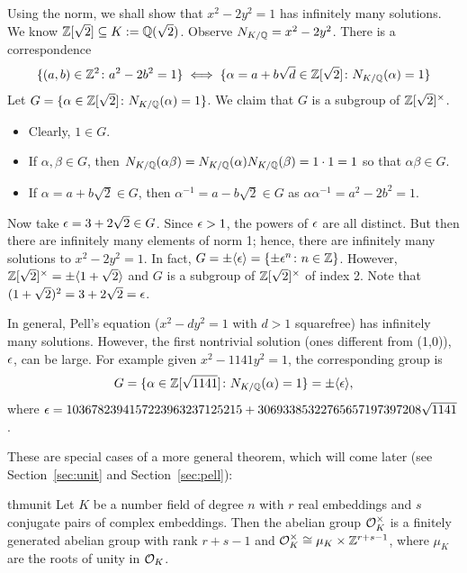 \begin{ex}[Pell's Equation, $n=2$] \label{ex:pell2}
Using the norm, we shall show that $x^2-2y^2=1$ has infinitely many solutions. We know $\mathbb{Z}[\sqrt{2}] \subseteq K:=\mathbb{Q}(\sqrt{2})$. Observe $N_{K/\mathbb{Q}}=x^2-2y^2$. There is a correspondence
	\[
	\{(a,b) \in \mathbb{Z}^2 \colon a^2-2b^2=1\} \iff \{\alpha=a+b\sqrt{d} \in \mathbb{Z}[\sqrt{2}] \colon N_{K/\mathbb{Q}}(\alpha)=1\}
	\] 
Let $G=\{\alpha \in \mathbb{Z}[\sqrt{2}] \colon N_{K/\mathbb{Q}}(\alpha)=1\}$. We claim that $G$ is a subgroup of $\mathbb{Z}[\sqrt{2}]^\times$.
	\begin{itemize}
	\item Clearly, $1 \in G$.
	\item If $\alpha, \beta \in G$, then $N_{K/\mathbb{Q}}(\alpha\beta)=N_{K/\mathbb{Q}}(\alpha)N_{K/\mathbb{Q}}(\beta)=1\cdot 1=1$ so that $\alpha\beta \in G$.
	\item If $\alpha=a+b\sqrt{2} \in G$, then $\alpha^{-1}=a-b\sqrt{2} \in G$ as $\alpha\alpha^{-1}=a^2-2b^2=1$.
	\end{itemize}
Now take $\epsilon=3+2\sqrt{2} \in G$. Since $\epsilon>1$, the powers of $\epsilon$ are all distinct. But then there are infinitely many elements of norm 1; hence, there are infinitely many solutions to $x^2-2y^2=1$. In fact, $G=\pm \langle \epsilon \rangle=\{ \pm \epsilon^n \colon n \in \mathbb{Z}\}$. However, $\mathbb{Z}[\sqrt{2}]^\times= \pm \langle 1+\sqrt{2}\rangle$ and $G$ is a subgroup of $\mathbb{Z}[\sqrt{2}]^\times$ of index 2. Note that $(1+\sqrt{2})^2=3+2\sqrt{2}=\epsilon$. \xqed
\end{ex}

\begin{ex} \label{ex:pellgen}
In general, Pell's equation ($x^2-dy^2=1$ with $d>1$ squarefree) has infinitely many solutions. However, the first nontrivial solution (ones different from (1,0)), $\epsilon$, can be large. For example given $x^2-1141y^2=1$, the corresponding group is 
	\[
	G=\{ \alpha \in \mathbb{Z}[\sqrt{1141}] \colon N_{K/\mathbb{Q}}(\alpha)=1\}= \pm \langle \epsilon \rangle,
	\]
where $\epsilon=1036782394157223963237125215+30693385322765657197397208\sqrt{1141}$. \xqed
\end{ex}


These are special cases of a more general theorem, which will come later (see Section~\ref{sec:unit} and Section~\ref{sec:pell}): 




\begin{restatable*}{thm}{unit} \label{thm:unit}
Let $K$ be a number field of degree $n$ with $r$ real embeddings and $s$ conjugate pairs of complex embeddings. Then the abelian group $\mathcal{O}_K^\times$ is a finitely generated abelian group with rank $r+s-1$ and $\mathcal{O}_K^\times \cong \mu_K \times \mathbb{Z}^{r+s-1}$, where $\mu_K$ are the roots of unity in $\mathcal{O}_K$. 
\end{restatable*}

